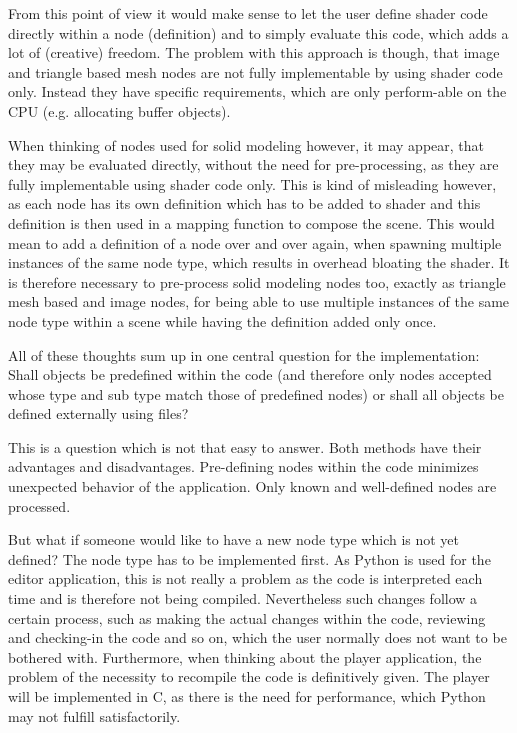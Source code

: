 \documentclass[
    a4paper,      %
    10pt,         %
    openright,    %
    notitlepage,  %
    parskip=half, %
]{scrreprt}       %
\theoremstyle{definition}                    %
\begin{document}
From this point of view it would make sense to let the user define shader
code directly within a node (definition) and to simply evaluate this code, which
adds a lot of (creative) freedom. The problem with this approach is though, that
image and triangle based mesh nodes are not fully implementable by using shader
code only. Instead they have specific requirements, which are only perform-able
on the CPU (e.g. allocating buffer objects).

When thinking of nodes used for solid modeling however, it may appear, that they
may be evaluated directly, without the need for pre-processing, as they are
fully implementable using shader code only. This is kind of misleading however,
as each node has its own definition which has to be added to shader and this
definition is then used in a mapping function to compose the scene. This would
mean to add a definition of a node over and over again, when spawning multiple
instances of the same node type, which results in overhead bloating the shader.
It is therefore necessary to pre-process solid modeling nodes too, exactly as
triangle mesh based and image nodes, for being able to use multiple instances of
the same node type within a scene while having the definition added only once.

All of these thoughts sum up in one central question for the implementation:
Shall objects be predefined within the code (and therefore only nodes accepted
whose type and sub type match those of predefined nodes) or shall all objects be
defined externally using files?

This is a question which is not that easy to answer. Both methods have their
advantages and disadvantages. Pre-defining nodes within the code minimizes
unexpected behavior of the application. Only known and well-defined nodes are
processed.

But what if someone would like to have a new node type which is not yet defined?
The node type has to be implemented first. As Python is used for the editor
application, this is not really a problem as the code is interpreted each time
and is therefore not being compiled. Nevertheless such changes follow a certain
process, such as making the actual changes within the code, reviewing and
checking-in the code and so on, which the user normally does not want to be
bothered with. Furthermore, when thinking about the player application, the
problem of the necessity to recompile the code is definitively given. The player
will be implemented in C, as there is the need for performance, which Python may
not fulfill satisfactorily.
\end{document}
